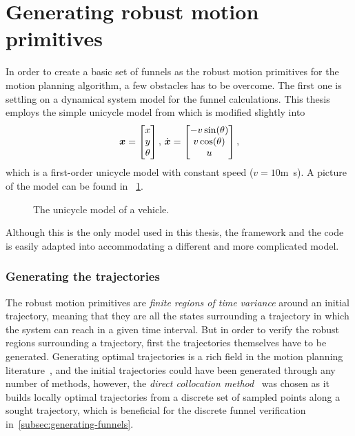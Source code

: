 \section{Generating robust motion primitives}
\label{sec:generating-robust-motion-primitives}

In order to create a basic set of funnels as the robust motion primitives for
the \rrtfunnel{} motion planning algorithm, a few obstacles has to be overcome.
The first one is settling on a dynamical system model for the funnel
calculations. This thesis employs the simple unicycle model from
\cite[LaValle][613]{Lav06} which is modified slightly into
\begin{equation}
  \label{eq:model-dynamics}
  \boldsymbol{x} =
  \begin{bmatrix}
    x \\ y \\ \theta \\
  \end{bmatrix}, \, \dot{\boldsymbol{x}} =
  \begin{bmatrix}
    -v \sin(\theta) \\
    v \cos(\theta) \\
    u \\
  \end{bmatrix},
\end{equation}
which is a first-order unicycle model with constant speed (\(v=10\)\si{m.s}). A
picture of the model can be found in ~\cref{fig:second-order-unicycle}.
\begin{figure}
  \caption{The unicycle model of a vehicle.}
  \label{fig:second-order-unicycle}
\end{figure}
Although this is the only model used in this thesis, the framework and the code
is easily adapted into accommodating a different and more complicated model.

\subsubsection{Generating the trajectories}
\label{subsec:generating-the-trajectories}

The robust motion primitives are \textit{finite regions of time variance} around
an initial trajectory, meaning that they are all the states surrounding a
trajectory in which the system can reach in a given time interval. But in order
to verify the robust regions surrounding a trajectory, first the trajectories
themselves have to be generated. Generating optimal trajectories is a rich field
in the motion planning literature~\cite{Betts_1998}, and the initial
trajectories could have been generated through any number of methods, however,
the \textit{direct collocation method}~\cite{von1993numerical} was chosen as it
builds locally optimal trajectories from a discrete set of sampled points along
a sought trajectory, which is beneficial for the discrete funnel verification
in~\cref{subsec:generating-funnels}.

